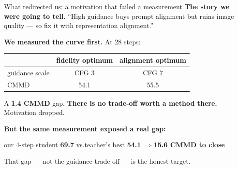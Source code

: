 \documentclass[10pt,aspectratio=169]{beamer}
\newcommand{\good}[1]{\textcolor{good}{\textbf{#1}}}
\newcommand{\bad}[1]{\textcolor{bad}{\textbf{#1}}}
\begin{document}
\begin{frame}{What redirected us: a motivation that failed a measurement}
  \textbf{The story we were going to tell.} ``High guidance buys prompt alignment
  but ruins image quality --- so fix it with representation alignment.''

  \vspace{0.8em}
  \textbf{We measured the curve first.} At 28 steps:
  \begin{center}
  \begin{tabular}{lcc}
    \toprule
    & fidelity optimum & alignment optimum \\
    \midrule
    guidance scale & CFG 3 & CFG 7 \\
    CMMD & 54.1 & 55.5 \\
    \bottomrule
  \end{tabular}
  \end{center}
  A \textbf{1.4 CMMD} gap. \bad{There is no trade-off worth a method there.} Motivation dropped.

  \vspace{0.8em}
  \textbf{But the same measurement exposed a real gap:}
  \begin{center}
    \large our 4-step student \textbf{69.7} \quad vs.\quad teacher's best \textbf{54.1}
    \quad$\Rightarrow$\quad \good{15.6 CMMD to close}
  \end{center}

  That gap --- not the guidance trade-off --- is the honest target.
\end{frame}
\end{document}
